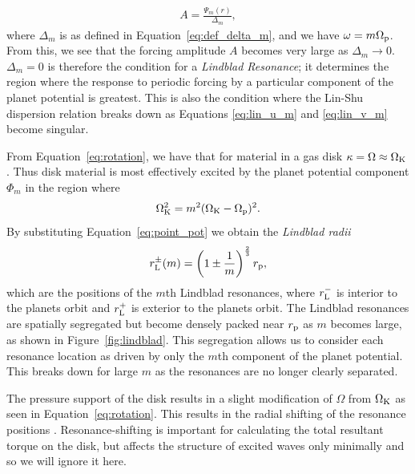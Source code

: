 \begin{align}
    A = \frac{\Psi_m (r)}{\Delta_m},
\end{align}
where $\Delta_m$ is as defined in Equation~\eqref{eq:def_delta_m}, and we have $\omega = m \Omega_{\rm p} $.
From this, we see that the forcing amplitude $A$ becomes very large as $\Delta_m \rightarrow 0$.
$\Delta_m = 0$ is therefore the condition for a \textit{Lindblad Resonance}; it determines the region where the response to periodic forcing by a particular component of the planet potential is greatest.
This is also the condition where the Lin-Shu dispersion relation breaks down as Equations \eqref{eq:lin_u_m} and \eqref{eq:lin_v_m} become singular.

From Equation~\eqref{eq:rotation}, we have that for material in a gas disk $\kappa = \Omega \approx \Omega_{\rm K}$.
Thus disk material is most effectively excited by the planet potential component $\Phi_m$ in the region where
\begin{align}
    \Omega_{\rm K}^2 = m^2 (\Omega_{\rm K} - \Omega_{\rm p})^2.
\end{align}
By substituting Equation~\eqref{eq:point_pot} we obtain the \textit{Lindblad radii}
\begin{align}
    r_{\rm L}^\pm(m) = \left( 1 \pm \frac{1}{m} \right)^\frac{2}{3} r_{\rm p}, \label{eq:lind_loc}
\end{align}
which are the positions of the $m$th Lindblad resonances, where $r_{\rm L}^-$ is interior to the planets orbit and $r_{\rm L}^+$ is exterior to the planets orbit.
The Lindblad resonances are spatially segregated but become densely packed near $r_{\rm p}$ as $m$ becomes large, as shown in Figure~\ref{fig:lindblad}.
This segregation allows us to consider each resonance location as driven by only the $m$th component of the planet potential.
This breaks down for large $m$ as the resonances are no longer clearly separated.

The pressure support of the disk results in a slight modification of $\Omega$ from $\Omega_{\rm K}$ as seen in Equation~\eqref{eq:rotation}.
This results in the radial shifting of the resonance positions \citep{artymowicz1993a}.
Resonance-shifting is important for calculating the total resultant torque on the disk, but affects the structure of excited waves only minimally and so we will ignore it here.

